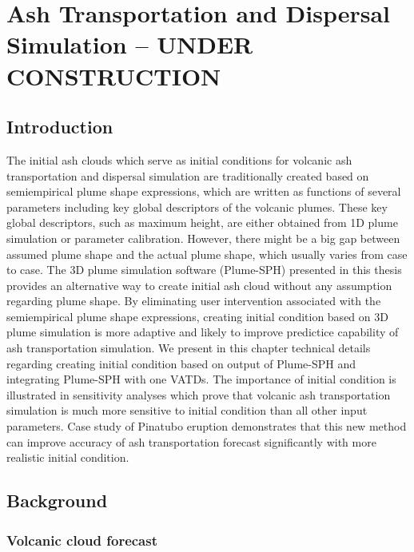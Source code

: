 \chapter{Ash Transportation and Dispersal Simulation -- UNDER CONSTRUCTION} \label{chapter:ash-transportation}

\section{Introduction}

The initial ash clouds which serve as initial conditions for volcanic ash transportation and dispersal simulation are traditionally created based on semiempirical plume shape expressions, which are written as functions of several parameters including key global descriptors of the volcanic plumes. These key global descriptors, such as maximum height, are either obtained from 1D plume simulation or parameter calibration. However, there might be a big gap between assumed plume shape and the actual plume shape, which usually varies from case to case. The 3D plume simulation software (Plume-SPH) presented in this thesis provides an alternative way to create initial ash cloud without any assumption regarding plume shape. By eliminating user intervention associated with the semiempirical plume shape expressions, creating initial condition based on 3D plume simulation is more adaptive and likely to improve predictice capability of ash transportation simulation.
We present in this chapter technical details regarding creating initial condition based on output of Plume-SPH and integrating Plume-SPH with one VATDs. 
The importance of initial condition is illustrated in sensitivity analyses which prove that volcanic ash transportation simulation is much more sensitive to initial condition than all other input parameters.
Case study of Pinatubo eruption demonstrates that this new method can improve accuracy of ash transportation forecast significantly with more realistic initial condition.  

\section{Background}

\subsection{Volcanic cloud forecast}

